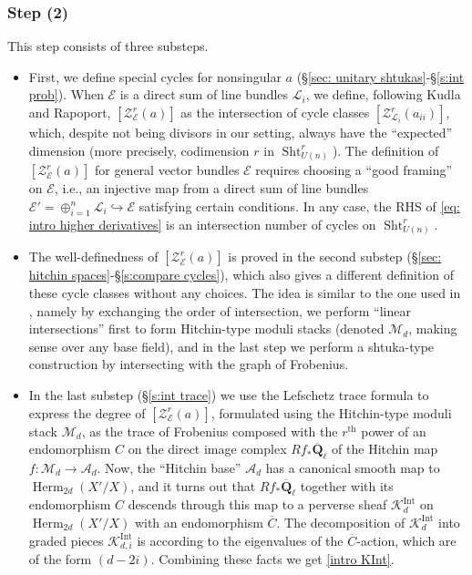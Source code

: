 \documentclass[reqno]{amsart}
\numberwithin{equation}{section}
\newcommand{\Q}{\mathbf{Q}}
\newcommand{\mrm}[1]{\mathrm{#1}}
\newcommand{\inj}{\hookrightarrow}
\DeclareMathOperator{\Sht}{Sht}
\DeclareMathOperator{\Herm}{Herm}
\DeclareMathOperator{\Int}{Int}
\newcommand{\Qlbar}{\overline{\Q}_\ell}
\newcommand{\ov}{\overline}
\newcommand\op{\oplus}
\newcommand\cA{\mathcal{A}}
\newcommand\cE{\mathcal{E}}
\newcommand\cK{\mathcal{K}}
\newcommand\cL{\mathcal{L}}
\newcommand\cM{\mathcal{M}}
\newcommand\cZ{\mathcal{Z}}
\theoremstyle{remark}
\numberwithin{equation}{section}
\begin{document}
\subsubsection{Step (2)} This step consists of three substeps. 
\begin{itemize}
\item First, we define special cycles for nonsingular $a$ (\S\ref{sec: unitary shtukas}-\S\ref{s:int prob}). When $\cE$ is a direct sum of line bundles $\cL_{i}$, we define, following Kudla and Rapoport, $[\cZ_{\cE}^{r}(a)]$ as the intersection of cycle classes $[\cZ_{\cL_{i}}^{r}(a_{ii})]$, which, despite not being divisors in our setting, always have the ``expected'' dimension (more precisely, codimension $r$ in $\Sht^{r}_{U(n)}$). The definition of $[\cZ^{r}_{\cE}(a)]$ for general vector bundles $\cE$ requires choosing a ``good framing'' on $\cE$, i.e., an injective map from a direct sum of line bundles $\cE'=\op_{i=1}^{n}\cL_{i}\inj \cE$ satisfying certain conditions.  In any case, the RHS of \eqref{eq: intro higher derivatives} is an intersection number of cycles on $\Sht^{r}_{U(n)}$.  
\item The well-definedness of $[\cZ^{r}_{\cE}(a)]$ is proved in the second substep (\S\ref{sec: hitchin spaces}-\S\ref{s:compare cycles}), which also gives a different definition of these cycle classes without any choices. The idea is similar to the one used in \cite{YZ}, namely by exchanging the order of intersection, we perform ``linear intersections'' first to form Hitchin-type moduli stacks (denoted $\cM_{d}$, making sense over any base field), and in the last step we perform a shtuka-type construction by intersecting with the graph of Frobenius. 
\item In the last substep (\S\ref{s:int trace}) we use the Lefschetz trace formula to express the degree of $[\cZ^{r}_{\cE}(a)]$, formulated using the Hitchin-type moduli stack $\cM_{d}$, as the trace of Frobenius composed with the $r^{\mrm{th}}$ power of an endomorphism $C$ on the direct image complex $Rf_{*}\Qlbar$ of the Hitchin map  $f:\cM_{d}\to \cA_{d}$. Now, the ``Hitchin base'' $\cA_d$ has a canonical smooth map to $\Herm_{2d}(X'/X)$, and it turns out that $Rf_{*}\Qlbar$ together with its endomorphism $C$ descends through this map to a perverse sheaf $\cK^{\Int}_{d}$ on $\Herm_{2d}(X'/X)$ with an endomorphism $\ov C$. The decomposition of $\cK^{\Int}_{d}$ into graded pieces $\cK^{\Int}_{d,i}$ is according to the eigenvalues of the $\ov C$-action, which are of the form $(d-2i)$. Combining these facts we get \eqref{intro KInt}.
\end{itemize}
\end{document}

